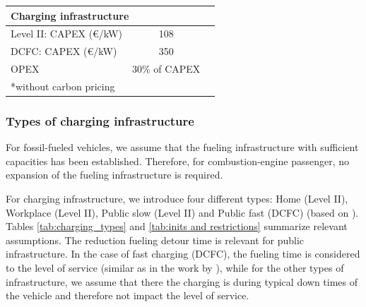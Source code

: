 \begin{table}[]
\begin{tabular}{@{}lrrrl@{}}
\multicolumn{5}{l}{\textbf{Charging infrastructure}}                                                                                  \\ \midrule
Level II: CAPEX (\euro/kW)                             & \multicolumn{3}{c}{108}                                                        &         \citep{Lanz2022}  \\
DCFC: CAPEX (\euro/kW)                             & \multicolumn{3}{c}{350}                                                        &  \citep{Lanz2022}         \\
OPEX                      & \multicolumn{3}{c}{30\% of CAPEX}                                                         &           \\ \midrule
\multicolumn{5}{l}{*without carbon pricing}                                                                                          
\end{tabular}
\end{table}
        \subsubsection{Types of charging infrastructure}
            For fossil-fueled vehicles, we assume that the fueling infrastructure with sufficient capacities has been established. Therefore, for combustion-engine passenger, no expansion of the fueling infrastructure is required. 
    
            For charging infrastructure, we introduce four different types: Home (Level II), Workplace (Level II), Public slow (Level II)\added{,} and Public fast (DCFC) (based on \citep{LAMONACA2022111733}). Tables \ref{tab:charging_types} and \ref{tab:inits and restrictions} summarize relevant assumptions. The reduction  fueling detour time is relevant for public infrastructure. In the case of fast charging (DCFC), the fueling time is considered  to the level of service (similar as in the work by \citet{LUH2024122412}), while for the other types of infrastructure, we assume that there the charging is during typical down times of the vehicle and therefore not impact the level of service. 

